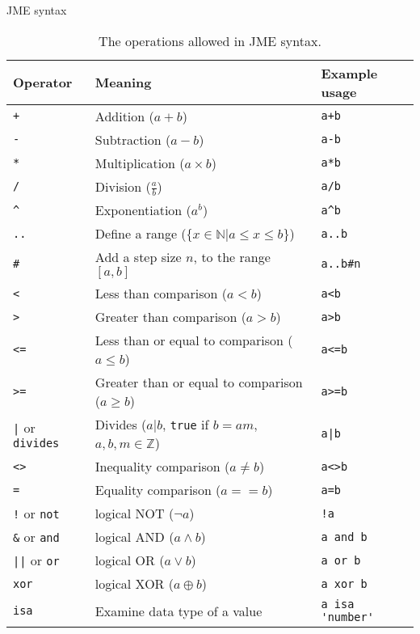 \begin{chapter}{\label{cha:jme_syntax}JME syntax}
  \begin{table}[ht]
    \centering
    \begin{tabular}{lp{20em}l}
      \hline
      Operator & Meaning & Example usage \\
      \hline
      \verb"+" & Addition ($a+b$) & \verb"a+b" \\
      \verb"-" & Subtraction ($a-b$) & \verb"a-b" \\
      \verb"*" & Multiplication ($a\times b$) & \verb"a*b" \\
      \verb"/" & Division ($\frac{a}{b}$) & \verb"a/b" \\
      \verb"^" & Exponentiation ($a^{b}$) & \verb"a^b" \\
      \verb".." & Define a range ($\{x \in \mathbb{N} | a \leq x \leq b\}$) &
      \verb"a..b" \\
      \verb"#" & Add a step size $n$, to the range $[a,b]$ & \verb"a..b#n" \\
      \verb"<" & Less than comparison ($a<b$) & \verb"a<b" \\
      \verb">" & Greater than comparison ($a>b$) & \verb"a>b" \\
      \verb"<="	& Less than or equal to comparison ($a\leq b$) & \verb"a<=b"
      \\
      \verb">="	& Greater than or equal to comparison ($a\geq b$) & \verb"a>=b"
      \\
      \verb"|" or \verb"divides" & Divides ($a|b$, \verb"true" if $b=am$,
      $a,b,m \in \mathbb{Z}$) & \verb"a|b" \\
      \verb"<>" & Inequality comparison ($a\neq b$)	& \verb"a<>b" \\
      \verb"=" & Equality comparison ($a==b$) & \verb"a=b" \\
      \verb"!" or \verb"not" & logical NOT ($\lnot a$)	& \verb"!a" \\
      \verb"&" or \verb"and" & logical AND ($a\land b$) & \verb"a and b" \\
      \verb"||" or \verb"or" & logical OR ($a\lor b$) & \verb"a or b" \\
      \verb"xor" & logical XOR ($a\oplus b$) & \verb"a xor b" \\
      \verb"isa" & Examine data type of a value & \verb"a isa 'number'" \\
      \hline
    \end{tabular}
    \caption{\label{tab:operations}
    	The operations allowed in JME syntax. 
    }
  \end{table}


\end{chapter}
